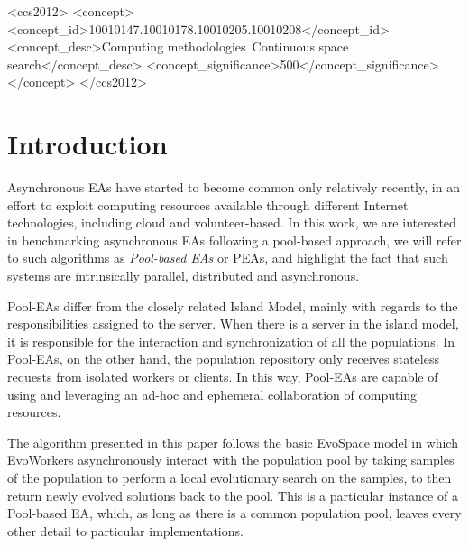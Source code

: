 \documentclass[sigconf]{acmart}
\begin{document}
%
%
 \begin{CCSXML}
<ccs2012>
<concept>
<concept_id>10010147.10010178.10010205.10010208</concept_id>
<concept_desc>Computing methodologies~Continuous space search</concept_desc>
<concept_significance>500</concept_significance>
</concept>
</ccs2012>
\end{CCSXML}





\maketitle


\section{Introduction}
Asynchronous EAs \cite{Jini:FEA2000,alba2001analyzing,Jini:FEA2000,jj:2008:PPSN} have
started to become common only relatively recently, in an effort to 
exploit computing resources available through different Internet technologies,
including cloud and volunteer-based. In this work, we are
interested in benchmarking asynchronous EAs following a pool-based 
approach, we will refer to such algorithms as {\em Pool-based EAs} 
or PEAs, and highlight the fact that such systems are 
intrinsically parallel, distributed and asynchronous.

Pool-EAs differ from the closely related Island Model, 
mainly with regards to the responsibilities assigned to 
the server. When there is a server in the island model, it is 
responsible for the interaction and synchronization of 
all the populations.  In Pool-EAs, on the other hand, the population repository only 
receives stateless requests from isolated workers 
or clients. In this way, Pool-EAs are capable of using and leveraging an 
ad-hoc and ephemeral collaboration of computing resources. 

The algorithm presented in this paper follows the basic 
EvoSpace model \cite{GValdez2015} in which EvoWorkers 
asynchronously interact with the population pool by 
taking samples of the population to perform a local 
evolutionary search on the samples, to then return newly
evolved solutions back to the pool. This is a
particular instance of a Pool-based EA, which, as long as there is a
common population pool, leaves every other detail to particular
implementations. 
\end{document}
